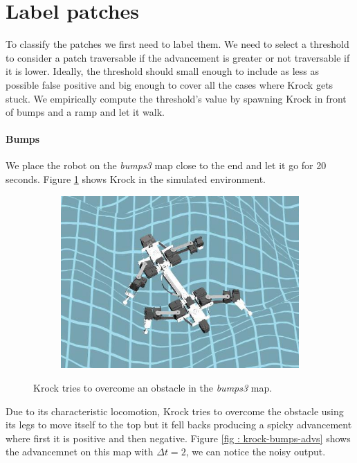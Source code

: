 \documentclass[../document.tex]{subfiles}
\begin{document}
\section{Label patches}
\label{sec : label-patches}
To classify the patches we first need to label them. We need to select a threshold to consider a patch traversable if the advancement is greater or not traversable if it is lower. Ideally, the threshold should small enough to include as less as possible false positive and big enough to cover all the cases where Krock gets stuck. We empirically compute the threshold's value by spawning Krock in front of bumps and a ramp and let it walk.
    \paragraph{Bumps} We place the robot on the \emph{bumps3} map close to the end and let it go for 20 seconds. Figure \ref{fig : krock-bumps-sim} shows Krock in the simulated environment.
    
    \begin{figure}[htbp]
    \centering
        \begin{subfigure}[b]{0.45\textwidth}
        \includegraphics[width=\linewidth]{../img/3/find_tr/krock-bumps.jpg}
        \end{subfigure}
    \caption{Krock tries to overcome an obstacle in the \emph{bumps3} map.}
    \label{fig : krock-bumps-sim}
    \end{figure}
    Due to its characteristic locomotion, Krock tries to overcome the obstacle using its legs to move itself to the top but it fell backs producing a spicky advancement where first it is positive and then negative. Figure \ref{fig : krock-bumps-advs} shows the advancemnet on this map with $\Delta t = 2$, we can notice the noisy output.
    
\end{document}

